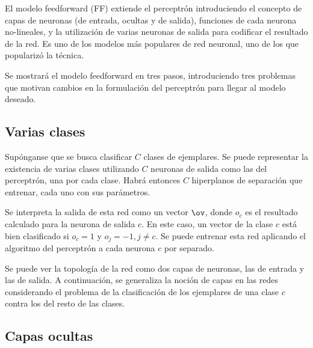 

El modelo feedforward (FF) extiende el perceptrón introduciendo el concepto de capas de neuronas (de entrada, ocultas y de salida), funciones de cada neurona no-lineales, y la utilización de varias neuronas de salida para codificar el resultado de la red. Es uno de los modelos más populares de red neuronal, uno de los que popularizó la técnica.


Se mostrará el modelo feedforward en tres pasos, introduciendo tres problemas que motivan cambios en la formulación del perceptrón para llegar al modelo deseado.

\subsection{Varias clases}

Supónganse que se busca clasificar $C$ clases de ejemplares. Se puede representar la existencia de varias clases utilizando $C$ neuronas de salida como las del perceptrón, una por cada clase. Habrá entonces $C$ hiperplanos de separación que entrenar, cada uno con sus parámetros. 



Se interpreta la salida de esta red como un vector $\ov$, donde $o_c$ es el resultado calculado para la neurona de salida $c$. En este caso, un vector de la clase $c$ está bien clasificado si $o_c=1$ y $o_j=-1, j \neq c$. Se puede entrenar esta red aplicando el algoritmo del perceptrón a cada neurona $c$ por separado. 


Se puede ver la topología de la red como dos capas de neuronas, las de entrada y las de salida. A continuación, se generaliza la noción de capas en las redes considerando el problema de la clasificación de los ejemplares de una clase $c$ contra los del resto de las clases.

\subsection{Capas ocultas}

